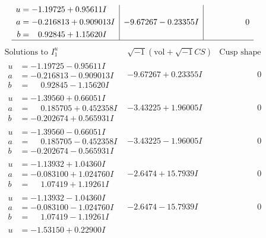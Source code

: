 \documentclass[1p]{elsarticle_modified}
\theoremstyle{definition}
\newcommand{\I}{\sqrt{-1}}
\begin{document}
$$\begin{array}{c|c|c}
\begin{aligned}
u &= -1.19725 + 0.95611 I \\
a &= -0.216813 + 0.909013 I \\
b &= \phantom{-}0.92845 + 1.15620 I\end{aligned}
 & -9.67267 - 0.23355 I & \phantom{-0.000000 } 0\\
 \hline 
 \end{array}$$\newpage$$\begin{array}{c|c|c}  
\text{Solutions to }I^u_{1}& \I (\text{vol} + \sqrt{-1}CS) & \text{Cusp shape}\\
 \hline 
\begin{aligned}
u &= -1.19725 - 0.95611 I \\
a &= -0.216813 - 0.909013 I \\
b &= \phantom{-}0.92845 - 1.15620 I\end{aligned}
 & -9.67267 + 0.23355 I & \phantom{-0.000000 } 0 \\ \hline\begin{aligned}
u &= -1.39560 + 0.66051 I \\
a &= \phantom{-}0.185705 + 0.452358 I \\
b &= -0.202674 + 0.565931 I\end{aligned}
 & -3.43225 + 1.96005 I & \phantom{-0.000000 } 0 \\ \hline\begin{aligned}
u &= -1.39560 - 0.66051 I \\
a &= \phantom{-}0.185705 - 0.452358 I \\
b &= -0.202674 - 0.565931 I\end{aligned}
 & -3.43225 - 1.96005 I & \phantom{-0.000000 } 0 \\ \hline\begin{aligned}
u &= -1.13932 + 1.04360 I \\
a &= -0.083100 + 1.024760 I \\
b &= \phantom{-}1.07419 + 1.19261 I\end{aligned}
 & -2.6474 + 15.7939 I & \phantom{-0.000000 } 0 \\ \hline\begin{aligned}
u &= -1.13932 - 1.04360 I \\
a &= -0.083100 - 1.024760 I \\
b &= \phantom{-}1.07419 - 1.19261 I\end{aligned}
 & -2.6474 - 15.7939 I & \phantom{-0.000000 } 0 \\ \hline\begin{aligned}
u &= -1.53150 + 0.22900 I \\

\end{aligned}
\end{array}$$
\end{document}
